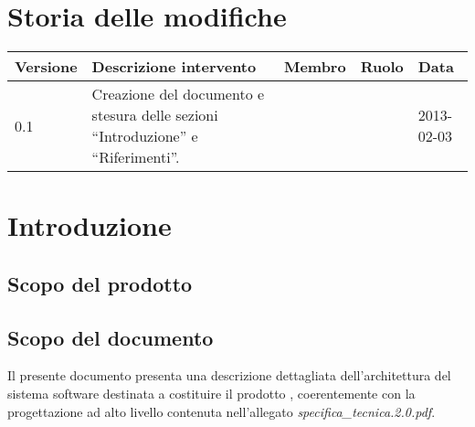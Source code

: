 





\section*{Storia delle modifiche}
\begin{center}
\begin{longtable}{lp{}lll}
\toprule
Versione & Descrizione intervento & Membro & Ruolo & Data\\
\midrule %
0.1 & Creazione del documento e stesura delle sezioni ``Introduzione'' e ``Riferimenti''. & &  & 2013-02-03\\
\bottomrule
\end{longtable}
\end{center}
\newpage



\setcounter{page}{1}
\pagestyle{normal}

\newpage

\section{Introduzione}
\subsection{Scopo del prodotto}
\purpose

\subsection{Scopo del documento}
Il presente documento presenta una descrizione dettagliata dell'architettura del sistema software destinata a costituire il prodotto \caName{}, coerentemente con la progettazione ad alto livello contenuta nell'allegato \textit{specifica\_tecnica.2.0.pdf}.

